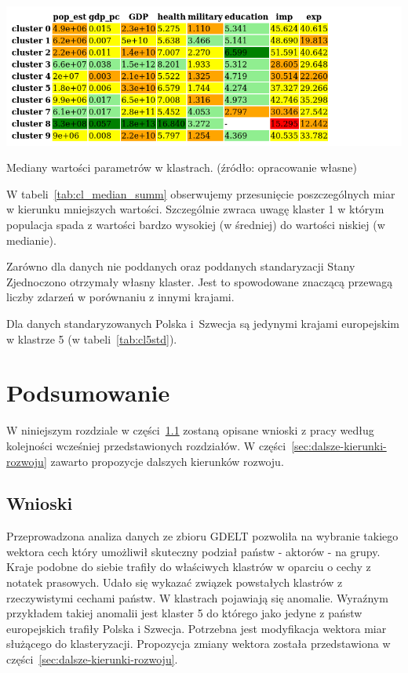 \documentclass[11pt]{report}
\begin{document}
    \begin{table}[!htp]
        \centering
        \includegraphics[width=\linewidth]{tables/CLUST/desc/cluster_median_summary.png}
        \caption{Mediany wartości parametrów w klastrach. (źródło: opracowanie własne)}
        \label{tab:cl_median_summ}
    \end{table}
    W tabeli~\ref{tab:cl_median_summ} obserwujemy przesunięcie poszczególnych miar w kierunku mniejszych wartości.
    Szczególnie zwraca uwagę klaster 1 w którym populacja spada z wartości bardzo wysokiej (w średniej) do wartości niskiej (w medianie).


    Zarówno dla danych nie poddanych oraz poddanych standaryzacji Stany Zjednoczono otrzymały własny klaster.
    Jest to spowodowane znaczącą przewagą liczby zdarzeń w porównaniu z innymi krajami.

    Dla danych standaryzowanych Polska i~Szwecja są jedynymi krajami europejskim w klastrze 5 (w tabeli~\ref{tab:cl5std}).


    \chapter{Podsumowanie}\label{ch:podsumowanie}
    W niniejszym rozdziale w części~\ref{sec:wnioski} zostaną opisane wnioski z pracy według kolejności wcześniej przedstawionych rozdziałów.
    W części~\ref{sec:dalsze-kierunki-rozwoju} zawarto propozycje dalszych kierunków rozwoju.


    \section{Wnioski}\label{sec:wnioski}
    Przeprowadzona analiza danych ze zbioru GDELT pozwoliła na wybranie takiego wektora cech który umożliwił skuteczny podział państw - aktorów - na grupy.
    Kraje podobne do siebie trafiły do właściwych klastrów w oparciu o cechy z notatek prasowych.
    Udało się wykazać związek powstałych klastrów z rzeczywistymi cechami państw.
    W klastrach pojawiają się anomalie.
    Wyraźnym przykładem takiej anomalii jest klaster 5 do którego jako jedyne z państw europejskich trafiły Polska i Szwecja.
    Potrzebna jest modyfikacja wektora miar służącego do klasteryzacji.
    Propozycja zmiany wektora została przedstawiona w części~\ref{sec:dalsze-kierunki-rozwoju}.
\end{document}

